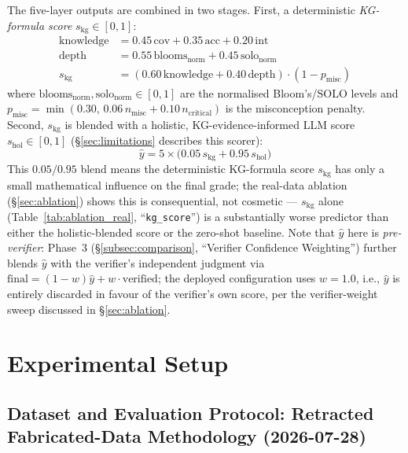 \documentclass[conference]{IEEEtran}
\begin{document}
The five-layer outputs are combined in two stages. First, a deterministic
\emph{KG-formula score} $s_{\text{kg}} \in [0,1]$:
\begin{align}
  \text{knowledge} &= 0.45\,\text{cov} + 0.35\,\text{acc} + 0.20\,\text{int} \nonumber \\
  \text{depth} &= 0.55\,\text{blooms}_{\text{norm}} + 0.45\,\text{solo}_{\text{norm}} \nonumber \\
  s_{\text{kg}} &= (0.60\,\text{knowledge} + 0.40\,\text{depth})\cdot(1 - p_{\text{misc}})
  \label{eq:kgformula}
\end{align}
where $\text{blooms}_{\text{norm}}, \text{solo}_{\text{norm}} \in [0,1]$
are the normalised Bloom's/SOLO levels and $p_{\text{misc}} =
\min(0.30,\, 0.06\,n_{\text{misc}} + 0.10\,n_{\text{critical}})$ is the
misconception penalty. Second, $s_{\text{kg}}$ is blended with a
holistic, KG-evidence-informed LLM score $s_{\text{hol}} \in [0,1]$
(\S\ref{sec:limitations} describes this scorer):
\begin{equation}
  \hat{y} = 5 \times \bigl(0.05\,s_{\text{kg}} + 0.95\,s_{\text{hol}}\bigr)
  \label{eq:composite}
\end{equation}
This $0.05/0.95$ blend means the deterministic KG-formula score
$s_{\text{kg}}$ has only a small mathematical influence on the final
grade; the real-data ablation (\S\ref{sec:ablation}) shows this is
consequential, not cosmetic --- $s_{\text{kg}}$ alone (Table~\ref{tab:ablation_real}, ``\texttt{kg\_score}'')
is a substantially worse predictor than either the holistic-blended
score or the zero-shot baseline. Note that $\hat{y}$ here is
\emph{pre-verifier}: Phase~3 (\S\ref{subsec:comparison}, ``Verifier
Confidence Weighting'') further blends $\hat{y}$ with the verifier's
independent judgment via $\text{final} = (1-w)\hat{y} + w\cdot\text{verified}$;
the deployed configuration uses $w=1.0$, i.e., $\hat{y}$ is entirely
discarded in favour of the verifier's own score, per the verifier-weight
sweep discussed in \S\ref{sec:ablation}.

\section{Experimental Setup}

\subsection{Dataset and Evaluation Protocol: Retracted Fabricated-Data Methodology (2026-07-28)}
\label{subsec:dataset_protocol}
\end{document}
